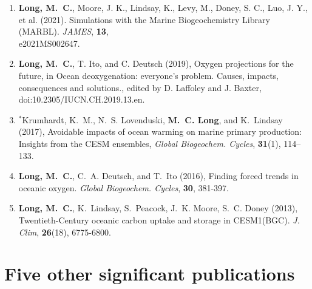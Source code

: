 \documentclass[12pt]{article}
\begin{document}
\begin{enumerate}[leftmargin=1.5em,font=\normalfont]
\setlength{\itemsep}{-0.2em}

\item
\textbf{{Long}, M.~C.}, Moore, J. K., Lindsay, K., Levy, M., Doney, S. C., Luo, J. Y., et al. (2021). Simulations with the Marine Biogeochemistry Library (MARBL). \textit{JAMES}, \textbf{13}, \\e2021MS002647.

\item
\textbf{{Long}, M.~C.}, T. Ito, and C. Deutsch (2019), Oxygen projections for the future, in Ocean deoxygenation:
everyone’s problem. Causes, impacts, consequences and solutions., edited by D. Laffoley and J. Baxter, doi:10.2305/IUCN.CH.2019.13.en.

\item
$^*${Krumhardt}, K.~M., N.~S. Lovenduski, \textbf{M.~C. Long}, and K.~Lindsay (2017),
  Avoidable impacts of ocean warming on marine primary production: Insights
  from the CESM ensembles, \textit{Global Biogeochem. Cycles},
  \textbf{31}(1), 114--133.

\item
\textbf{{Long}, M.~C.}, C.~A. {Deutsch}, and T.~Ito (2016), Finding forced trends in oceanic oxygen. \textit{Global Biogeochem. Cycles}, \textbf{30}, 381-397.

\item
\textbf{Long, M.~C.}, K.~Lindsay, S.~Peacock, J.~K. Moore, S.~C. Doney (2013), {Twentieth-Century oceanic carbon uptake and storage in CESM1(BGC)}. \textit{J. Clim}, \textbf{26}(18), 6775-6800.

\end{enumerate}


\section{Five other significant publications}
\end{document}
